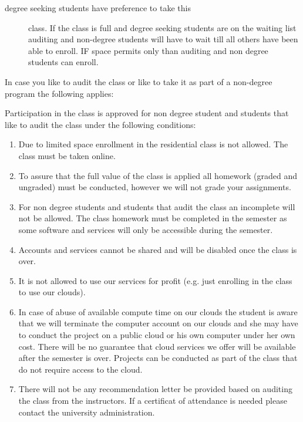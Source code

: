 \begin{description}
\item[degree seeking students have preference to take this]
class. If the class is full and degree seeking students are on the
waiting list auditing and non-degree students will have to wait till all
others have been able to enroll. IF space permits only than auditing and
non degree students can enroll.
\end{description}

In case you like to audit the class or like to take it as part of a
non-degree program the following applies:

Participation in the class is approved for non degree student and
students that like to audit the class under the following conditions:

\begin{enumerate}
\tightlist
\item
  Due to limited space enrollment in the residential class is not
  allowed. The class must be taken online.
\item
  To assure that the full value of the class is applied all homework
  (graded and ungraded) must be conducted, however we will not grade
  your assignments.
\item
  For non degree students and students that audit the class an
  incomplete will not be allowed. The class homework must be completed
  in the semester as some software and services will only be accessible
  during the semester.
\item
  Accounts and services cannot be shared and will be disabled once the
  class is over.
\item
  It is not allowed to use our services for profit (e.g. just enrolling
  in the class to use our clouds).
\item
  In case of abuse of available compute time on our clouds the student
  is aware that we will terminate the computer account on our clouds and
  she may have to conduct the project on a public cloud or his own
  computer under her own cost. There will be no guarantee that cloud
  services we offer will be available after the semester is over.
  Projects can be conducted as part of the class that do not require
  access to the cloud.
\item
  There will not be any recommendation letter be provided based on
  auditing the class from the instructors. If a certificat of attendance
  is needed please contact the university administration.
\end{enumerate}


